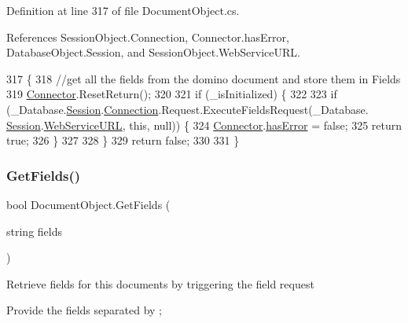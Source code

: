 Definition at line 317 of file Document\+Object.\+cs.



References Session\+Object.\+Connection, Connector.\+has\+Error, Database\+Object.\+Session, and Session\+Object.\+Web\+Service\+U\+RL.


\begin{DoxyCode}
317                                \{
318         \textcolor{comment}{//get all the fields from the domino document and store them in Fields}
319         \hyperlink{class_connector}{Connector}.ResetReturn();
320 
321         \textcolor{keywordflow}{if} (\_isInitialized) \{
322 
323             \textcolor{keywordflow}{if} (\_Database.\hyperlink{class_database_object_aa8484162b7d2a7c4c9426bca13c64c07}{Session}.\hyperlink{class_session_object_a014bdbf705a753540e19bfb53030c55c}{Connection}.Request.ExecuteFieldsRequest(\_Database.
      \hyperlink{class_database_object_aa8484162b7d2a7c4c9426bca13c64c07}{Session}.\hyperlink{class_session_object_a697c071c812fbf7ad1166b896fb44c16}{WebServiceURL}, \textcolor{keyword}{this}, null)) \{
324                 \hyperlink{class_connector}{Connector}.\hyperlink{class_connector_a079bae21a5417efa53bfe8954c0f533f}{hasError} = \textcolor{keyword}{false};
325                 \textcolor{keywordflow}{return} \textcolor{keyword}{true};
326             \}
327 
328         \}
329         \textcolor{keywordflow}{return} \textcolor{keyword}{false};
330 
331     \}
\end{DoxyCode}
\mbox{\label{class_document_object_a8883fec3b5b1b6e2e43f4b5ca4092684}} 
\subsubsection{\texorpdfstring{Get\+Fields()}{GetFields()}\hspace{0.1cm}{\footnotesize\ttfamily [1/2]}}
{\footnotesize\ttfamily bool Document\+Object.\+Get\+Fields (\begin{DoxyParamCaption}\item[{string}]{fields }\end{DoxyParamCaption})}



Retrieve fields for this documents by triggering the field request 

Provide the fields separated by ;

